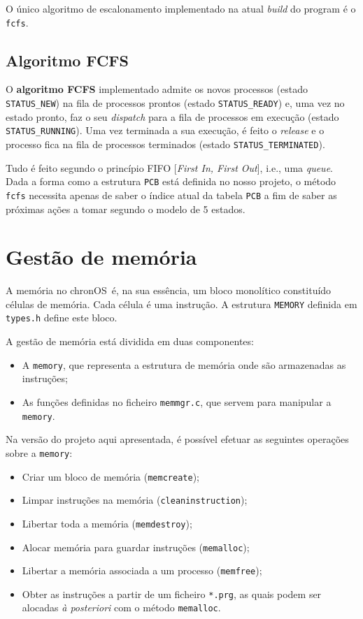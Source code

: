 \documentclass[a4paper,11pt,onecolumn,oneside]{article}
\newcommand{\chronOS}{\textsf{chronOS}}
\begin{document}
	O único algoritmo de escalonamento implementado na atual \textit{build} do program é o \texttt{\ac{fcfs}}.
	
	
	\subsection{Algoritmo FCFS}
	\label{ssec:process:fcfs}
	
	O \textbf{algoritmo FCFS} implementado admite os novos processos (estado \texttt{STATUS\_NEW}) na fila de processos prontos (estado \texttt{STATUS\_READY}) e, uma vez no estado pronto, faz o seu \textit{dispatch} para a fila de processos em execução (estado \texttt{STATUS\_RUNNING}). Uma vez terminada a sua execução, é feito o \textit{release} e o processo fica na fila de processos terminados (estado \texttt{STATUS\_TERMINATED}).
	
	Tudo é feito segundo o princípio FIFO [\textit{First In, First Out}], i.e., uma \textit{queue}. Dada a forma como a estrutura \verb|PCB| está definida no nosso projeto, o método \verb|fcfs| necessita apenas de saber o índice atual da tabela \verb|PCB| a fim de saber as próximas ações a tomar segundo o modelo de 5 estados.
	
	
	\section{Gestão de memória}
	\label{sec:memory}
	
	A memória no \chronOS~é, na sua essência, um bloco monolítico constituído células de memória. Cada célula é uma instrução. A estrutura \verb|MEMORY| definida em \texttt{types.h} define este bloco.
	
	A gestão de memória está dividida em duas componentes:
	\begin{itemize}
		\item A \verb|memory|, que representa a estrutura de memória onde são armazenadas as instruções;
		\item As funções definidas no ficheiro \verb|memmgr.c|, que servem para manipular a \verb|memory|.
	\end{itemize}
	
	Na versão do projeto aqui apresentada, é possível efetuar as seguintes operações sobre a \verb|memory|:
	\begin{itemize}
		\item Criar um bloco de memória (\verb|memcreate|);
		\item Limpar instruções na memória (\verb|cleaninstruction|);
		\item Libertar toda a memória (\verb|memdestroy|);
		\item Alocar memória para guardar instruções (\verb|memalloc|);
		\item Libertar a memória associada a um processo (\verb|memfree|);
		\item Obter as instruções a partir de um ficheiro \verb|*.prg|, as quais podem ser alocadas \textit{à posteriori} com o método \verb|memalloc|.
	\end{itemize}
	
\end{document}
